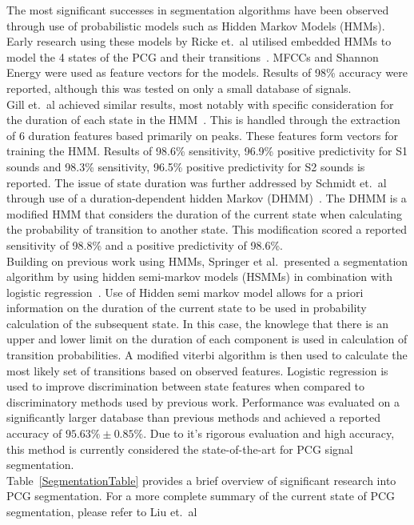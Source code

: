 \documentclass[titlepage, 12pt]{scrartcl} \usepackage{enumitem}
\begin{document}
The most significant successes in segmentation algorithms have been observed through use
of probabilistic models such as Hidden Markov Models (HMMs). Early research
using these models by Ricke et.\ al utilised embedded HMMs to model the 4
states of the PCG and their transitions~\parencite{Ricke2005}. MFCCs and
Shannon Energy were used as feature vectors for the models. Results of
98\% accuracy were reported, although this was tested on only a small database
of signals.\\
Gill et.\ al achieved similar results, most notably with specific consideration
for the duration of each state in the HMM~\parencite{Gill2005}. This is
handled through the extraction of 6 duration features based primarily on peaks.
These features form vectors for training the HMM. Results of 98.6\%
sensitivity, 96.9\% positive predictivity for S1 sounds and 98.3\% sensitivity,
96.5\% positive predictivity for S2 sounds is reported.
The issue of state duration was further addressed by Schmidt et.\ al through use
of a duration-dependent hidden Markov (DHMM)~\parencite{Schmidt2015}. The
DHMM is a modified HMM that considers the duration of the current state when
calculating the probability of transition to another state. This modification
scored a reported sensitivity of 98.8\% and a positive predictivity of
98.6\%.\\
Building on previous work using HMMs, Springer et al.\ presented a segmentation
algorithm by using hidden semi-markov models (HSMMs) in combination with
logistic regression~\parencite{Springer2016}. Use of Hidden semi markov model
allows for a priori information on the duration of the current state to be used
in probability calculation of the subsequent state. In this case, the knowlege
that there is an upper and lower limit on the duration of each component is
used in calculation of transition probabilities.  A modified viterbi algorithm
is then used to calculate the most likely set of transitions based on observed
features. Logistic regression is used to improve discrimination between state
features when compared to discriminatory methods used by previous work.
Performance was evaluated on a significantly larger database than previous
methods and achieved a reported accuracy of $95.63\% \pm 0.85\%$. Due to it's
rigorous evaluation and high accuracy, this method is currently considered the
state-of-the-art for PCG signal segmentation.\\

Table~\ref{SegmentationTable} provides a brief overview of significant research
into PCG segmentation. For a more complete summary of the current state of PCG
segmentation, please refer to Liu et.\ al~\parencite{Liu2016}
\end{document}
